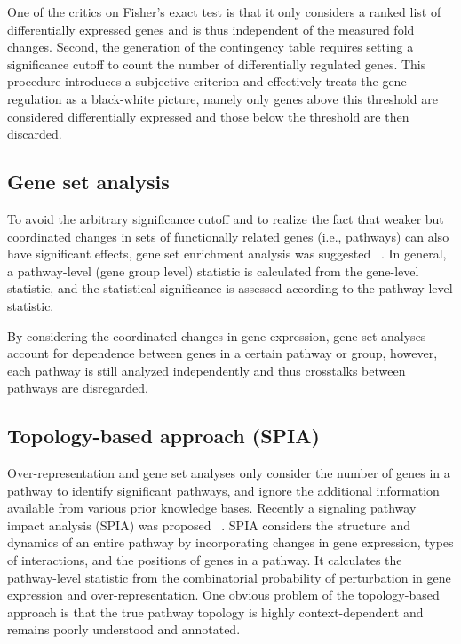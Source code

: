 One of the critics on Fisher's exact test is that it only considers a ranked
list of differentially expressed genes and is thus independent of the 
measured fold changes. Second, the generation of the contingency table
requires setting a significance cutoff to count the number of differentially
regulated genes. This procedure introduces a subjective criterion and 
effectively treats the gene regulation as a black-white picture, namely only 
genes above this threshold are considered differentially expressed and those
below the threshold are then discarded.
    
\subsection{Gene set analysis}
To avoid the arbitrary significance cutoff and to realize the fact that weaker 
but coordinated changes in sets of functionally related genes (i.e., pathways) 
can also have significant effects, gene set enrichment analysis was suggested~%
\citep{Subramanian2005,Luo2009}. In general,
a pathway-level (gene group level) statistic is calculated from the gene-level 
statistic, and the statistical significance is assessed according to the 
pathway-level statistic.

By considering the coordinated changes in gene expression, gene set analyses 
account for dependence between genes in a certain pathway or group, however,
each pathway is still analyzed independently and thus crosstalks between
pathways are disregarded.

\subsection{Topology-based approach (SPIA)}
Over-representation and gene set analyses only consider the number of genes 
in a pathway to identify significant pathways, and ignore the additional 
information available from various prior knowledge bases. Recently a signaling
pathway impact analysis (SPIA) was proposed~%
\citep{Tarca2009}. SPIA considers the structure and dynamics of an entire 
pathway by incorporating changes in gene expression, types of interactions, 
and the positions of genes in a pathway. 
It calculates the pathway-level statistic from the combinatorial probability 
of perturbation in gene expression and over-representation. One obvious problem 
of the topology-based approach is that the true pathway topology is highly
context-dependent and remains poorly understood and annotated.

